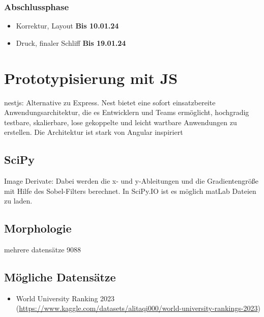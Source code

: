 \subsubsection*{Abschlussphase}
\begin{itemize}
    \item Korrektur, Layout \textbf{Bis 10.01.24}
    \item Druck, finaler Schliff \textbf{Bis 19.01.24}
\end{itemize}

\section{Prototypisierung mit JS}
nestjs: Alternative zu Express. Nest bietet eine sofort einsatzbereite Anwendungsarchitektur, die es Entwicklern und Teams ermöglicht, hochgradig testbare, skalierbare, lose gekoppelte und leicht wartbare Anwendungen zu erstellen. Die Architektur ist stark von Angular inspiriert

\subsection*{SciPy}
Image Derivate: Dabei werden die x- und y-Ableitungen und die Gradientengröße mit Hilfe des Sobel-Filters berechnet. 
In SciPy.IO ist es möglich matLab Dateien zu laden.


\subsection*{Morphologie}
mehrere datensätze 9088

\subsection*{Mögliche Datensätze}
\begin{itemize}
    \item World University Ranking 2023 (\url{https://www.kaggle.com/datasets/alitaqi000/world-university-rankings-2023})
\end{itemize}